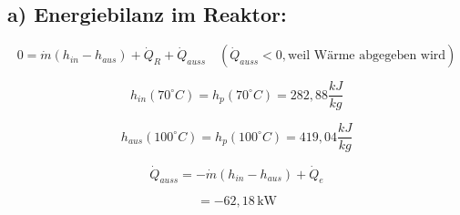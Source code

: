 \subsection*{a) Energiebilanz im Reaktor:}

\[
0 = \dot{m} \left( h_{in} - h_{aus} \right) + \dot{Q}_R + \dot{Q}_{auss} \quad (\dot{Q}_{auss} < 0, \text{weil Wärme abgegeben wird})
\]

\[
h_{in} (70^\circ C) = h_p (70^\circ C) = 282,88 \frac{kJ}{kg}
\]

\[
h_{aus} (100^\circ C) = h_p (100^\circ C) = 419,04 \frac{kJ}{kg}
\]

\[
\dot{Q}_{auss} = -\dot{m} \left( h_{in} - h_{aus} \right) + \dot{Q}_e
\]

\[
= -62,18 \, \text{kW}
\]
